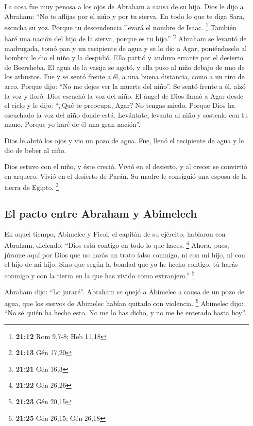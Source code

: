 \begin{paracol}{2}
 La cosa fue muy penosa a los ojos de Abraham a causa de
su hijo.  Dios le dijo a Abraham: ``No te aflijas por el
niño y por tu sierva. En todo lo que te diga Sara, escucha su voz.
Porque tu descendencia llevará el nombre de Isaac. \footnote{\textbf{21:12}
  Rom 9,7-8; Heb 11,18}  También haré una nación del hijo
de la sierva, porque es tu hijo.'' \footnote{\textbf{21:13} Gén 17,20}
 Abraham se levantó de madrugada, tomó pan y un
recipiente de agua y se lo dio a Agar, poniéndoselo al hombro; le dio el
niño y la despidió. Ella partió y anduvo errante por el desierto de
Beersheba.  El agua de la vasija se agotó, y ella puso al
niño debajo de uno de los arbustos.  Fue y se sentó
frente a él, a una buena distancia, como a un tiro de arco. Porque dijo:
``No me dejes ver la muerte del niño''. Se sentó frente a él, alzó la
voz y lloró.  Dios escuchó la voz del niño. El ángel de
Dios llamó a Agar desde el cielo y le dijo: ``¿Qué te preocupa, Agar? No
tengas miedo. Porque Dios ha escuchado la voz del niño donde está.
 Levántate, levanta al niño y sostenlo con tu mano.
Porque yo haré de él una gran nación''.

 Dios le abrió los ojos y vio un pozo de agua. Fue, llenó
el recipiente de agua y le dio de beber al niño.

 Dios estuvo con el niño, y éste creció. Vivió en el
desierto, y al crecer se convirtió en arquero.  Vivió en
el desierto de Parán. Su madre le consiguió una esposa de la tierra de
Egipto. \footnote{\textbf{21:21} Gén 16,3}

\hypertarget{el-pacto-entre-abraham-y-abimelech}{%
\subsection{El pacto entre Abraham y
Abimelech}\label{el-pacto-entre-abraham-y-abimelech}}

 En aquel tiempo, Abimelec y Ficol, el capitán de su
ejército, hablaron con Abraham, diciendo: ``Dios está contigo en todo lo
que haces. \footnote{\textbf{21:22} Gén 26,26}  Ahora,
pues, júrame aquí por Dios que no harás un trato falso conmigo, ni con
mi hijo, ni con el hijo de mi hijo. Sino que según la bondad que yo he
hecho contigo, tú harás conmigo y con la tierra en la que has vivido
como extranjero.'' \footnote{\textbf{21:23} Gén 20,15}

 Abraham dijo: ``Lo juraré''.  Abraham se
quejó a Abimelec a causa de un pozo de agua, que los siervos de Abimelec
habían quitado con violencia. \footnote{\textbf{21:25} Gén 26,15; Gén
  26,18}  Abimelec dijo: ``No sé quién ha hecho esto. No
me lo has dicho, y no me he enterado hasta hoy''.


\end{paracol}
